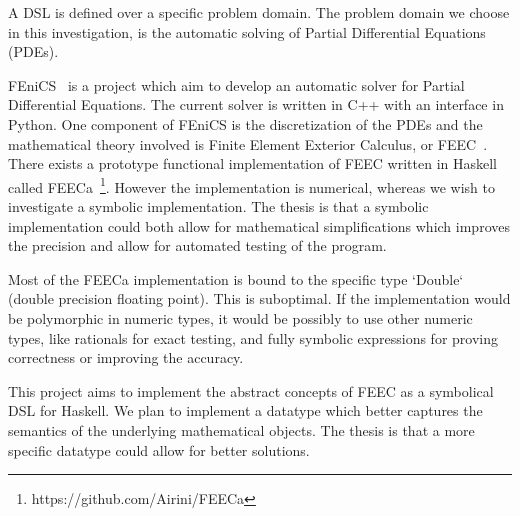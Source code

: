 \documentclass{scrartcl}
\begin{document}
A DSL is defined over a specific problem domain. The problem domain we choose
in this investigation, is the automatic solving of Partial Differential
Equations (PDEs).

FEniCS~\cite{AlnaesBlechta2015a} is a project which aim to develop an
automatic solver for Partial Differential Equations. The current
solver is written in C++ with an interface in Python. One component of
FEniCS is the discretization of the PDEs and the mathematical theory
involved is Finite Element Exterior Calculus, or
FEEC~\cite{arnold2006finite}. There exists a prototype functional
implementation of FEEC written in Haskell called
FEECa~\footnote{https://github.com/Airini/FEECa}.  However the
implementation is numerical, whereas we wish to investigate a symbolic
implementation.  The thesis is that a symbolic implementation could
both allow for mathematical simplifications which improves the
precision and allow for automated testing of the program.


Most of the FEECa implementation is bound to the specific type
`Double` (double precision floating point). This is suboptimal. If the
implementation would be polymorphic in numeric types, it would be
possibly to use other numeric types, like rationals for exact testing,
and fully symbolic expressions for proving correctness or improving
the accuracy.


This project aims to implement the abstract concepts of FEEC as a symbolical
DSL for Haskell.  %
We plan to implement a datatype which better captures the semantics of the
underlying mathematical objects.  The thesis is that a more specific datatype
could allow for better solutions.

\end{document}
